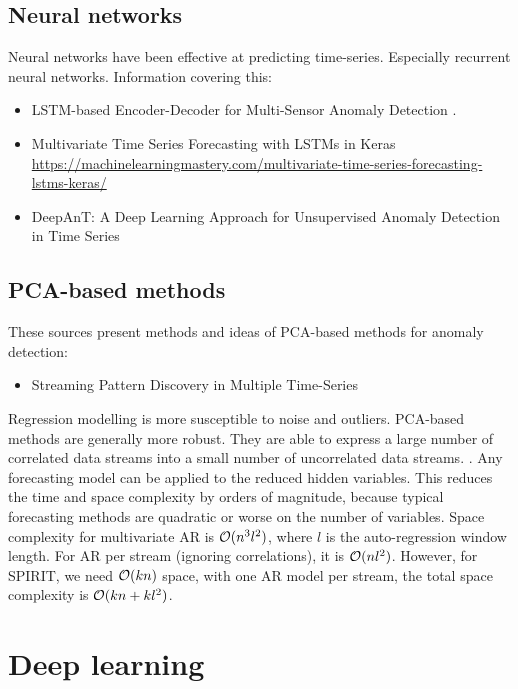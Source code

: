 \subsection{Neural networks} Neural networks have been effective at predicting time-series. Especially recurrent neural networks. Information covering this:
\begin{itemize}
    \item LSTM-based Encoder-Decoder for Multi-Sensor Anomaly Detection \cite{Malhotra2016a}.
    \item Multivariate Time Series Forecasting with LSTMs in Keras \newline \url{https://machinelearningmastery.com/multivariate-time-series-forecasting-lstms-keras/}
    \item DeepAnT: A Deep Learning Approach for Unsupervised Anomaly Detection in Time Series \cite{Munir2019DeepAnT:Series}
\end{itemize}


\subsection{PCA-based methods} These sources present methods and ideas of PCA-based methods for anomaly detection:
\begin{itemize}
    \item Streaming Pattern Discovery in Multiple Time-Series \cite{Papadimitriou2005StreamingTime-series}
\end{itemize}

Regression modelling is more susceptible to noise and outliers. PCA-based methods are generally more robust. They are able to express a large number of correlated data streams into a small number of uncorrelated data streams. \cite{Aggarwal2013a}. Any forecasting model can be applied to the reduced hidden variables. This reduces the time and space complexity by orders of magnitude, because typical forecasting methods are quadratic or worse on the number of variables. Space complexity for multivariate AR is $\mathcal{O}{(n^3l^2)}$, where $l$ is the auto-regression window length. For AR per stream (ignoring correlations), it is $\mathcal{O}{(nl^2)}$. However, for SPIRIT, we need $\mathcal{O}{(kn)}$ space, with one AR model per stream, the total space complexity is $\mathcal{O}{(kn+kl^2)}$. \cite{Papadimitriou2005StreamingTime-series}


\section{Deep learning}


